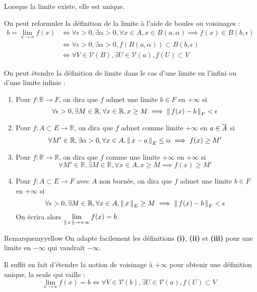     Lorsque la limite existe, elle est unique.

    On peut reformuler la définition de la limite à l’aide de boules ou voisinages : 
    \begin{align*}
        b = \lim\limits_{x \rightarrow a}  f(x) & \iff \forall \epsilon > 0, \exists \alpha > 0, \forall x \in A, x \in B(a,\alpha) \implies f(x) \in B(b,\epsilon) \\
        & \iff \forall \epsilon > 0, \exists \alpha > 0, f\left(B(a,\alpha)\right) \subset B(b,\epsilon) \\
        & \iff \forall V \in \mathcal{V}(B), \exists U \in \mathcal{V}(a), f(U) \subset V
    \end{align*}

    On peut étendre la définition de limite dans le cas d’une limite en l’infini ou d’une limite infinie : 

    \begin{defi}{}{}
        \begin{enumerate}
            \item Pour $f : \mathbb{R} \rightarrow F$, on dira que $f$ admet une limite $b \in F$ en $+ \infty$ si 
            \[ \forall \epsilon > 0, \exists M \in \mathbb{R}, \forall x \in \mathbb{R}, x \geq M \implies \left\lVert\,f(x)-b\,\right\rVert_F < \epsilon \] 
            \item Pour $f : A \subset E \rightarrow \mathbb{R}$, on dira que $f$ admet comme limite $+ \infty$ en $a \in \overline{A}$ si 
            \[ \forall M' \in \mathbb{R}, \exists \alpha > 0, \forall x \in A, \left\lVert\,x-a\,\right\rVert_E \leq \alpha \implies f(x) \geq M' \] 
            \item Pour $f : \mathbb{R} \rightarrow \mathbb{R}$, on dira que $f$ comme une limite $+\infty$ en $+\infty$ si 
            \[ \forall M' \in \mathbb{R}, \exists M \in \mathbb{R}, \forall x \in A, x \geq M \implies f(x) \geq M' \] 
            \item Pour $f : A \subset E \rightarrow F$ avec $A$ non bornée, on dira que $f$ admet une limite $b \in F$ en $+ \infty$ si 
            \[ \forall \epsilon > 0, \exists M \in \mathbb{R}, \forall x \in A, \left\lVert\,x\,\right\rVert_E \geq M \implies \left\lVert\,f(x)-b\,\right\rVert_F < \epsilon \] 
            On écrira alors $\lim\limits_{\left\lVert\,x\,\right\rVert \rightarrow + \infty} f(x) = b$.
        \end{enumerate}
    \end{defi}

    \begin{omed}{Remarque}{myyellow}
        On adapte facilement les définitions \textbf{(i)}, \textbf{(ii)} et \textbf{(iii)} pour une limite en $-\infty$ qui vaudrait $-\infty$.

        Il suffit en fait d’étendre la notion de voisinage à $+ \infty$ pour obtenir une définition unique, la seule qui vaille :
        \[ \lim\limits_{x \rightarrow a} f(x) = b \iff \forall V \in \mathcal{V}(b), \exists U \in \mathcal{V}(a), f(U) \subset V \]
    \end{omed}

